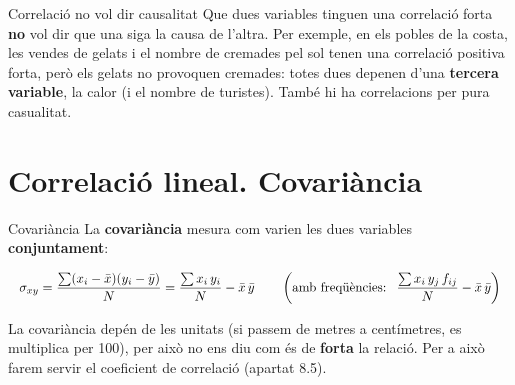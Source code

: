\documentclass[11pt,a4paper]{article}
\makeatletter
\newcommand{\lt}{<}\newcommand{\gt}{>}
\newcommand{\fmm}[1]{\setbox0=\hbox{$#1$}\ifdim\wd0>0.8\linewidth\def\fmmnext{\fmmdisp{#1}}\else\def\fmmnext{\mbox{\box0}}\fi\fmmnext}
\def\fmmdisp#1{\@ifnextchar.{\fmmdispp{#1}}{\@ifnextchar,{\fmmdispc{#1}}{\@ifnextchar;{\fmmdisps{#1}}{\fmdisp{#1}}}}}
\def\fmmdispp#1.{\fmdisp{#1\,.}}\def\fmmdispc#1,{\fmdisp{#1\,,}}\def\fmmdisps#1;{\fmdisp{#1\,;}}
\newcommand{\fmdisp}[1]{\[\setbox2=\hbox{$\displaystyle #1$}\ifdim\wd2>\linewidth\resizebox{\linewidth}{!}{\box2}\else\box2\fi\]}
\makeatother
\begin{document}
\begin{fmprop}{Correlació no vol dir causalitat}
Que dues variables tinguen una correlació forta \textbf{no} vol dir que una siga la causa de l'altra. Per exemple, en els pobles de la costa, les vendes de gelats i el nombre de cremades pel sol tenen una correlació positiva forta, però els gelats no provoquen cremades: totes dues depenen d'una \textbf{tercera variable}, la calor (i el nombre de turistes). També hi ha correlacions per pura casualitat.
\end{fmprop}

\Needspace{5.7cm}
\section{Correlació lineal. Covariància}\hypertarget{sec4}{}

\begin{fmprop}{Covariància}
La \textbf{covariància} mesura com varien les dues variables \textbf{conjuntament}:

\fmdisp{\sigma_{xy}=\frac{\sum(x_i-\bar x)(y_i-\bar y)}{N}=\frac{\sum x_i\,y_i}{N}-\bar x\,\bar y\qquad\left(\text{amb freqüències: }\ \frac{\sum x_i\,y_j\,f_{ij}}{N}-\bar x\,\bar y\right)}


\begin{fmnote}La covariància depén de les unitats (si passem de metres a centímetres, es multiplica per 100), per això no ens diu com és de \textbf{forta} la relació. Per a això farem servir el coeficient de correlació (apartat 8.5).\end{fmnote}
\end{fmprop}
\end{document}
